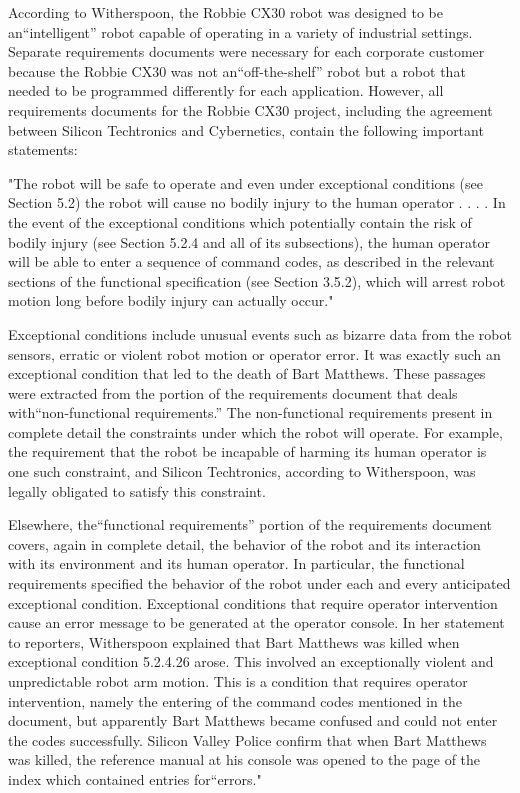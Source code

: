 According to Witherspoon, the Robbie CX30 robot was designed to be an``intelligent'' robot capable of operating in a variety of industrial settings. Separate requirements documents were necessary for each corporate customer because the Robbie CX30 was not an``off-the-shelf'' robot but a robot that needed to be programmed differently for each application. However, all requirements documents for the Robbie CX30 project, including the agreement between Silicon Techtronics and Cybernetics, contain the following important statements:

"The robot will be safe to operate and even under exceptional conditions (see Section 5.2) the robot will cause no bodily injury to the human operator . . . . In the event of the exceptional conditions which potentially contain the risk of bodily injury (see Section 5.2.4 and all of its subsections), the human operator will be able to enter a sequence of command codes, as described in the relevant sections of the functional specification (see Section 3.5.2), which will arrest robot motion long before bodily injury can actually occur."

Exceptional conditions include unusual events such as bizarre data from the robot sensors, erratic or violent robot motion or operator error. It was exactly such an exceptional condition that led to the death of Bart Matthews. These passages were extracted from the portion of the requirements document that deals with``non-functional requirements.'' The non-functional requirements present in complete detail the constraints under which the robot will operate. For example, the requirement that the robot be incapable of harming its human operator is one such constraint, and Silicon Techtronics, according to Witherspoon, was legally obligated to satisfy this constraint.

Elsewhere, the``functional requirements'' portion of the requirements document covers, again in complete detail, the behavior of the robot and its interaction with its environment and its human operator. In particular, the functional requirements specified the behavior of the robot under each and every anticipated exceptional condition. Exceptional conditions that require operator intervention cause an error message to be generated at the operator console. In her statement to reporters, Witherspoon explained that Bart Matthews was killed when exceptional condition 5.2.4.26 arose. This involved an exceptionally violent and unpredictable robot arm motion. This is a condition that requires operator intervention, namely the entering of the command codes mentioned in the document, but apparently Bart Matthews became confused and could not enter the codes successfully. Silicon Valley Police confirm that when Bart Matthews was killed, the reference manual at his console was opened to the page of the index which contained entries for``errors."

